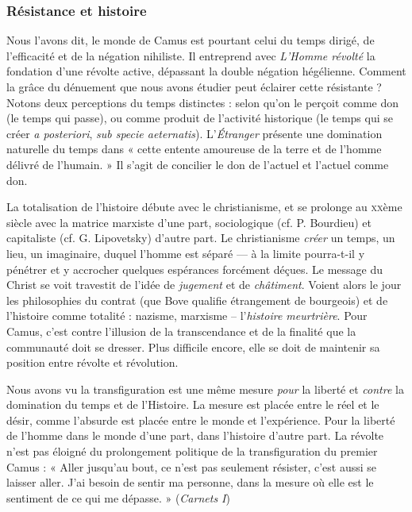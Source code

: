 \documentclass[11pt]{amsart}
\begin{document}
\subsubsection{Résistance et histoire}

Nous l'avons dit, le monde de Camus est pourtant celui du temps dirigé, de l'efficacité et de la négation nihiliste. Il entreprend avec \textsl{L'Homme révolté} la fondation d'une révolte active, dépassant la double négation hégélienne. Comment la grâce du dénuement que nous avons étudier peut éclairer cette résistante ? Notons deux perceptions du temps distinctes : selon qu'on le perçoit comme don (le temps qui passe), ou comme produit de l'activité historique (le temps qui se créer \textit{a posteriori}, \textit{sub specie aeternatis}). L'\textsl{\'Etranger} présente une domination naturelle du temps dans « cette entente amoureuse de la terre et de l'homme délivré de l'humain. » Il s'agit de concilier le don de l'actuel et l'actuel comme don.

La totalisation de l'histoire débute avec le christianisme, et se prolonge au \textsc{xx}{ème} siècle avec la matrice marxiste d'une part, sociologique (cf. P. Bourdieu) et capitaliste (cf. G. Lipovetsky) d'autre part. Le christianisme \textit{créer} un temps, un lieu, un imaginaire, duquel l'homme est séparé — à la limite pourra-t-il y pénétrer et y accrocher quelques espérances forcément déçues. Le message du Christ se voit travestit de l'idée de \textit{jugement} et de \textit{châtiment}. Voient alors le jour les philosophies du contrat (que Bove qualifie étrangement de bourgeois) et de l'histoire comme totalité : nazisme, marxisme – l'\textit{histoire meurtrière}. Pour Camus, c'est contre l'illusion de la transcendance et de la finalité que la communauté doit se dresser. Plus difficile encore, elle se doit de maintenir sa position entre révolte et révolution.
\vspace{5pt}

Nous avons vu la transfiguration est une même mesure \textit{pour} la liberté et \textit{contre} la domination du temps et de l'Histoire. La mesure est placée entre le réel et le désir, comme l'absurde est placée entre le monde et l'expérience. Pour la liberté de l'homme dans le monde d'une part, dans l'histoire d'autre part. La révolte n'est pas éloigné du prolongement politique de la transfiguration du premier Camus : « Aller jusqu'au bout, ce n'est pas seulement résister, c'est aussi se laisser aller. J'ai besoin de sentir ma personne, dans la mesure où elle est le sentiment de ce qui me dépasse. » (\textsl{Carnets I})
\end{document}
